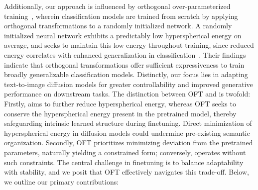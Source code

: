 Additionally, our approach is influenced by orthogonal over-parameterized training~\cite{liu2021orthogonal}, wherein classification models are trained from scratch by applying orthogonal transformations to a randomly initialized network. A randomly initialized neural network exhibits a predictably low hyperspherical energy on average, and \cite{liu2021orthogonal} seeks to maintain this low energy throughout training, since reduced energy correlates with enhanced generalization in classification~\cite{liu2018learning,lin2020regularizing}. Their findings indicate that orthogonal transformations offer sufficient expressiveness to train broadly generalizable classification models. Distinctly, our focus lies in adapting text-to-image diffusion models for greater controllability and improved generative performance on downstream tasks. The distinction between OFT and \cite{liu2021orthogonal} is twofold: Firstly, \cite{liu2021orthogonal} aims to further reduce hyperspherical energy, whereas OFT seeks to conserve the hyperspherical energy present in the pretrained model, thereby safeguarding intrinsic learned structure during finetuning. Direct minimization of hyperspherical energy in diffusion models could undermine pre-existing semantic organization. Secondly, OFT prioritizes minimizing deviation from the pretrained parameters, naturally yielding a constrained form; conversely, \cite{liu2021orthogonal} operates without such constraints. The central challenge in finetuning is to balance adaptability with stability, and we posit that OFT effectively navigates this trade-off. Below, we outline our primary contributions:

